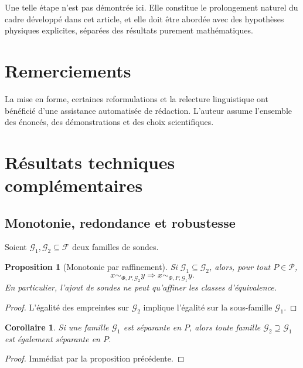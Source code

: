 \documentclass[11pt,a4paper,openany]{book}
\newtheorem{proposition}[definition]{Proposition}
\newtheorem{corollary}[definition]{Corollaire}
\begin{document}
Une telle étape n'est pas démontrée ici. Elle constitue le prolongement naturel du cadre développé dans cet article, et elle doit être abordée avec des hypothèses physiques explicites, séparées des résultats purement mathématiques.

\section*{Remerciements}
La mise en forme, certaines reformulations et la relecture linguistique ont bénéficié d'une assistance automatisée de rédaction. L'auteur assume l'ensemble des énoncés, des démonstrations et des choix scientifiques.







\section{Résultats techniques complémentaires}

\subsection{Monotonie, redondance et robustesse}

Soient \(\mathcal G_1,\mathcal G_2\subseteq\mathcal F\) deux familles de sondes.

\begin{proposition}[Monotonie par raffinement]
Si \(\mathcal G_1\subseteq\mathcal G_2\), alors, pour tout \(P\in\mathcal P\),
\[
x\sim_{\Phi,P,\mathcal G_2}y \Longrightarrow x\sim_{\Phi,P,\mathcal G_1}y.
\]
En particulier, l'ajout de sondes ne peut qu'affiner les classes d'équivalence.
\end{proposition}

\begin{proof}
L'égalité des empreintes sur \(\mathcal G_2\) implique l'égalité sur la sous-famille \(\mathcal G_1\).
\end{proof}

\begin{corollary}
Si une famille \(\mathcal G_1\) est séparante en \(P\), alors toute famille \(\mathcal G_2\supseteq\mathcal G_1\) est également séparante en \(P\).
\end{corollary}

\begin{proof}
Immédiat par la proposition précédente.
\end{proof}
\end{document}
